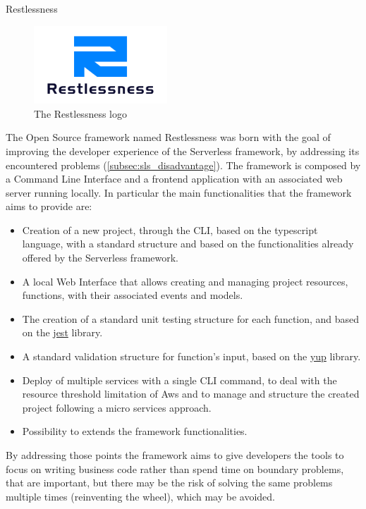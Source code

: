 \begin{chapter}{Restlessness}
    \label{chap:restlessness}

    \begin{figure}
        \centering
        \includegraphics[width=5cm]{source/images/restlessness_logo.png}
        \caption{The Restlessness logo}
    \end{figure}


    The Open Source framework named Restlessness was born with the goal of improving
    the developer experience of the Serverless framework, by addressing its encountered
    problems (\ref{subsec:sls_disadvantage}).
    The framework is composed by a Command Line Interface and a frontend application
    with an associated web server running locally.
    In particular the main functionalities that the framework aims to provide are:
    \begin{itemize}
        \item Creation of a new project, through the CLI, based on the typescript
            language, with a standard structure and based on the functionalities
            already offered by the Serverless framework.
        \item A local Web Interface that allows creating and managing project resources,
            functions, with their associated events and models.
        \item The creation of a standard unit testing structure for each function,
            and based on the \href{https://www.npmjs.com/package/jest}{jest} library.
        \item A standard validation structure for function's input, based on the
            \href{https://www.npmjs.com/package/yup}{yup} library.
        \item Deploy of multiple services with a single CLI command, to deal with
            the resource threshold limitation of Aws and to manage and structure
            the created project following a micro services approach.
        \item Possibility to extends the framework functionalities.
    \end{itemize}
    By addressing those points the framework aims to give developers the tools to
    focus on writing business code rather than spend time on boundary problems,
    that are important, but there may be the risk of solving the same problems
    multiple times (reinventing the wheel), which may be avoided.


\end{chapter}
